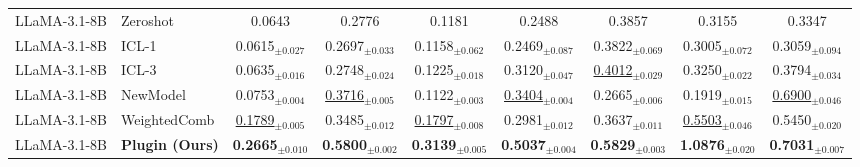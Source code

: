 \begin{table*}[t]
{\begin{tabular}{|llccccccc|}
        \hline
        LLaMA-3.1-8B & Zeroshot & 0.0643 & 0.2776 & 0.1181 & 0.2488 & 0.3857 & 0.3155 & 0.3347\\
        LLaMA-3.1-8B & ICL-1 & 0.0615$_{\pm0.027}$ & 0.2697$_{\pm0.033}$ & 0.1158$_{\pm0.062}$ & 0.2469$_{\pm0.087}$ & 0.3822$_{\pm0.069}$ & 0.3005$_{\pm0.072}$ & 0.3059$_{\pm0.094}$\\
        LLaMA-3.1-8B & ICL-3 & 0.0635$_{\pm0.016}$ & 0.2748$_{\pm0.024}$ & 0.1225$_{\pm0.018}$ & 0.3120$_{\pm0.047}$ & \underline{0.4012}$_{\pm0.029}$ & 0.3250$_{\pm0.022}$ & 0.3794$_{\pm0.034}$\\
        LLaMA-3.1-8B & NewModel & 0.0753$_{\pm0.004}$ & \underline{0.3716}$_{\pm0.005}$ & 0.1122$_{\pm0.003}$ & \underline{0.3404}$_{\pm0.004}$ & 0.2665$_{\pm0.006}$ & 0.1919$_{\pm0.015}$ & \underline{0.6900}$_{\pm0.046}$\\
        LLaMA-3.1-8B & WeightedComb & \underline{0.1789}$_{\pm0.005}$ & 0.3485$_{\pm0.012}$ & \underline{0.1797}$_{\pm0.008}$ & 0.2981$_{\pm0.012}$ & 0.3637$_{\pm0.011}$ & \underline{0.5503}$_{\pm0.046}$ & 0.5450$_{\pm0.020}$\\
        LLaMA-3.1-8B & \textbf{Plugin (Ours)} & \textbf{0.2665}$_{\pm0.010}$ & \textbf{0.5800}$_{\pm0.002}$ & \textbf{0.3139}$_{\pm0.005}$ & \textbf{0.5037}$_{\pm0.004}$ & \textbf{0.5829}$_{\pm0.003}$ & \textbf{1.0876}$_{\pm0.020}$ & \textbf{0.7031}$_{\pm0.007}$\\
        \hline
    \end{tabular}
    }
        \vspace{-3mm}

\end{table*}




